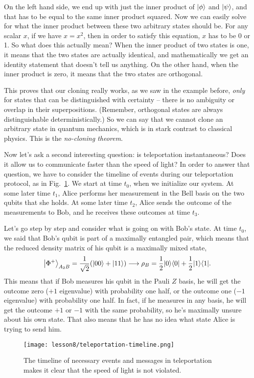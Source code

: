 On the left hand side, we end up with just the inner product of $\left| \phi \right\rangle$ and $\left| \psi \right\rangle$, and that has to be equal to the same inner product squared. Now we can easily solve for what the inner product between these two arbitrary states should be. For any scalar $x$, if we have $x = x^2$, then in order to satisfy this equation, $x$ has to be 0 or 1. So what does this actually mean? When the inner product of two states is one, it means that the two states are actually identical, and mathematically we get an identity statement that doesn't tell us anything. On the other hand, when the inner product is zero, it means that the two states are orthogonal.

This proves that our cloning really works, as we saw in the example before, \emph{only} for states that can be distinguished with certainty -- there is no ambiguity or overlap in their superpositions. (Remember, orthogonal states are always distinguishable deterministically.) So we can say that we cannot clone an arbitrary state in quantum mechanics, which is in stark contrast to classical physics. This is the \emph{no-cloning theorem}.

Now let's ask a second interesting question: is teleportation instantaneous? Does it allow us to communicate faster than the speed of light? In order to answer that question, we have to consider the timeline of events during our teleportation protocol, as in Fig.~\ref{fig:teleportation-timeline}. We start at time $t_0$, when we initialize our system. At some later time $t_1$, Alice performs her measurement in the Bell basis on the two qubits that she holds. At some later time $t_2$, Alice sends the outcome of the measurements to Bob, and he receives these outcomes at time $t_3$.

Let's go step by step and consider what is going on with Bob's state. At time $t_0$, we said that Bob's qubit is part of a maximally entangled pair, which means that the reduced density matrix of his qubit is a maximally mixed state,
\begin{equation}
\left|\Phi^{+}\right\rangle_{A_2 B}=\frac{1}{\sqrt{2}}(|00\rangle+|11\rangle) \longrightarrow \rho_B=\frac{1}{2}|0 \rangle \langle 0| +\frac{1}{2}|1 \rangle \langle 1|.
\end{equation}
This means that if Bob measures his qubit in the Pauli $Z$ basis, he will get the outcome zero ($+1$ eigenvalue) with probability one half, or the outcome one ($-1$ eigenvalue) with probability one half. In fact, if he measures in any basis, he will get the outcome $+1$ or $-1$ with the same probability, so he's maximally unsure about his own state. That also means that he has no idea what state Alice is trying to send him.
\begin{figure}[H]
    \centering
    \texttt{[image: lesson8/teleportation-timeline.png]}
        \caption[Event timing in teleportation.]{The timeline of necessary events and messages in teleportation makes it clear that the speed of light is not violated.}
    \label{fig:teleportation-timeline}
\end{figure}

